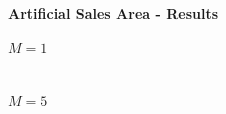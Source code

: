 \documentclass[xcolor=dvipsnames,aspectratio=169, handout, mathserif]{beamer}
\begin{document}
\begin{frame}{\textbf{Artificial Sales Area - Results}}
\centering
\begin{minipage}{0.47\linewidth}
\begin{center}
    $M = 1$\\[0.5em]
     \\[-0.5cm]
\end{center}
\end{minipage}
\begin{minipage}{0.47\linewidth}
\begin{center}
    $M=5$ \\[0.5em]
     \\[-0.5cm]
\end{center}
\end{minipage}
\end{frame}
\end{document}
